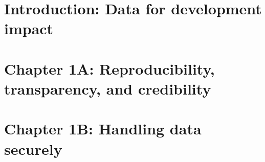 %
%
%
%




\cleardoublepage
\chapter{Introduction: Data for development impact} %





\chapter{Chapter 1A: Reproducibility, transparency, and credibility}
\label{ch:1}





\chapter{Chapter 1B: Handling data securely}
\label{ch:1}




